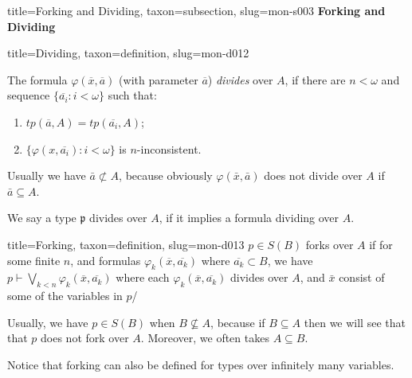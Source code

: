 \documentclass[a4paper]{article}
\begin{document}
\begin{tree}{title={Forking and Dividing}, taxon={subsection}, slug={mon-s003}}
\textbf{Forking and Dividing}
\begin{tree}{title={Dividing}, taxon={definition}, slug={mon-d012}}

The formula \(\varphi ( \overline {x}, \overline {a})\) (with parameter \(\overline {a}\)) \emph{divides} over \(A\), if there are \(n< \omega\) and sequence \(\{ \overline {a_i}:i< \omega \}\) such that:
\begin{enumerate}
\item{\(tp( \overline {a},A)=tp( \overline {a_i},A)\);}
    \item{\(\{ \varphi (x, \overline {a_i}):i< \omega \}\) is \(n\)-inconsistent.}
\end{enumerate}
Usually we have \(\bar {a} \not \subset  A\), because obviously \(\varphi ( \bar {x}, \bar {a})\) does not divide over \(A\) if \(\bar {a} \subseteq  A\).

We say a type \(\mathfrak {p}\) divides over \(A\), if it implies a formula dividing over \(A\).

\end{tree}

\begin{tree}{title={Forking}, taxon={definition}, slug={mon-d013}}
 \(p \in  S(B)\) forks over \(A\) if for some finite \(n\), and formulas \(\varphi _k( \overline {x}, \overline {a_{k}})\) where \(\overline {a_k} \subset  B\), we have \(p \vdash \bigvee _{k<n} \varphi _k( \overline {x}, \overline {a_{k}})\) where each \(\varphi _k( \overline {x}, \overline {a_{k}})\) divides over \(A\), and \(\bar {x}\) consist of some of the variables in \(p\)/

Usually, we have \(p \in  S(B)\) when \(B \not \subseteq  A\), because if \(B \subseteq  A\) then we will see that that \(p\) does not fork over \(A\). Moreover, we often takes \(A \subseteq  B\).

Notice that forking can also be defined for types over infinitely many variables.

\end{tree}

\end{tree}

\printbibliography
\end{document}
